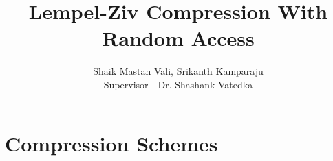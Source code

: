 \documentclass[a4paper]{article}
\title{\textbf{Lempel-Ziv Compression With Random Access} }
\author{
Shaik Mastan Vali, Srikanth Kamparaju\\
Supervisor - Dr. Shashank Vatedka 
}
\date{}
\begin{document}
\maketitle


\section{Compression Schemes }





\end{document}
